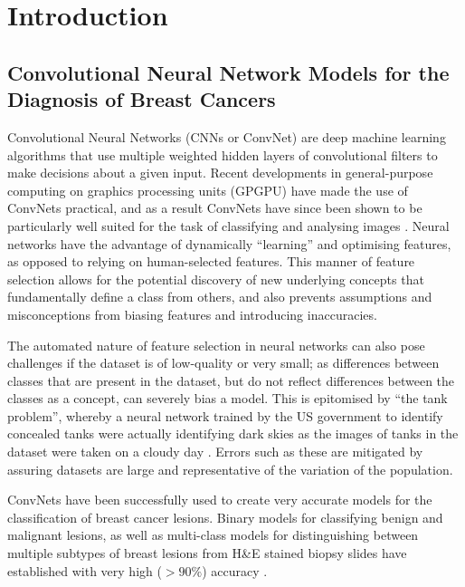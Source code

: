 \section{Introduction}

\subsection{Convolutional Neural Network Models for the Diagnosis of Breast Cancers}

Convolutional Neural Networks (CNNs or ConvNet) are deep machine learning algorithms that use multiple weighted hidden layers of convolutional filters to make decisions about a given input. Recent developments in general-purpose computing on graphics processing units (GPGPU) have made the use of ConvNets practical, and as a result ConvNets have since been shown to be particularly well suited for the task of classifying and analysing images \citep{ciresan2011, ciresan2012}. Neural networks have the advantage of dynamically ``learning'' and optimising features, as opposed to relying on human-selected features. This manner of feature selection allows for the potential discovery of new underlying concepts that fundamentally define a class from others, and also prevents assumptions and misconceptions from biasing features and introducing inaccuracies.\par

The automated nature of feature selection in neural networks can also pose challenges if the dataset is of low-quality or very small; as differences between classes that are present in the dataset, but do not reflect differences between the classes as a concept, can severely bias a model. This is epitomised by ``the tank problem'', whereby a neural network trained by the US government to identify concealed tanks were actually identifying dark skies as the images of tanks in the dataset were taken on a cloudy day \citep{dreyfus1992}. Errors such as these are mitigated by assuring datasets are large and representative of the variation of the population.\par

ConvNets have been successfully used to create very accurate models for the classification of breast cancer lesions. Binary models for classifying benign and malignant lesions, as well as multi-class models for distinguishing between multiple subtypes of breast lesions from H\&E stained biopsy slides have established with very high ($>90\%$) accuracy \citep{wei2017, han2017}.  
